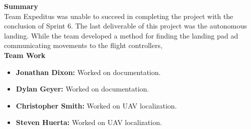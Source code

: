 \noindent \large{\textbf{Summary}}\\
\normalsize Team Expeditus was unable to succeed in completing the project with the conclusion of Sprint 6. The last deliverable of this project was the autonomous landing. While the team developed a method for finding the landing pad ad communicating movements to the flight controllers, 
\vspace{5mm}
\\
\noindent \Large{\textbf{Team Work}}
\normalsize
\begin{itemize}
\item \textbf{Jonathan Dixon:} Worked on documentation.
\item \textbf{Dylan Geyer:} Worked on documentation.
\item \textbf{Christopher Smith:} Worked on UAV localization.
\item \textbf{Steven Huerta:} Worked on UAV localization. 
\end{itemize}

